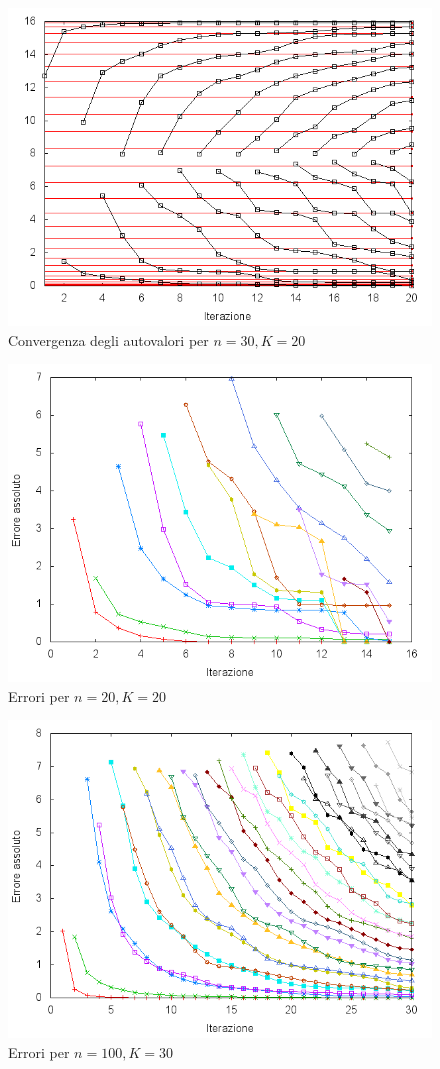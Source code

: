\documentclass[11pt]{article}
\numberwithin{equation}{subsection}
\theoremstyle{connome}
\theoremstyle{connomesenzanumero}
\theoremstyle{connome+}
\theoremstyle{connomesenzanumero+}
\begin{document}
\begin{figure}[htb]
\centering
\includegraphics[width=.9\linewidth]{img/eigv_n30K20.png}
\caption{Convergenza degli autovalori per $n = 30, K = 20$}
\end{figure}

\begin{figure}[htb]
\centering
\includegraphics[width=.9\linewidth]{./img/errors_n20K20.png}
\caption{Errori per $n=20, K=20$}
\end{figure}

\begin{figure}[htb]
\centering
\includegraphics[width=.9\linewidth]{./img/errors_n100K30.png}
\caption{Errori per $n=100, K=30$}
\end{figure}
\end{document}
